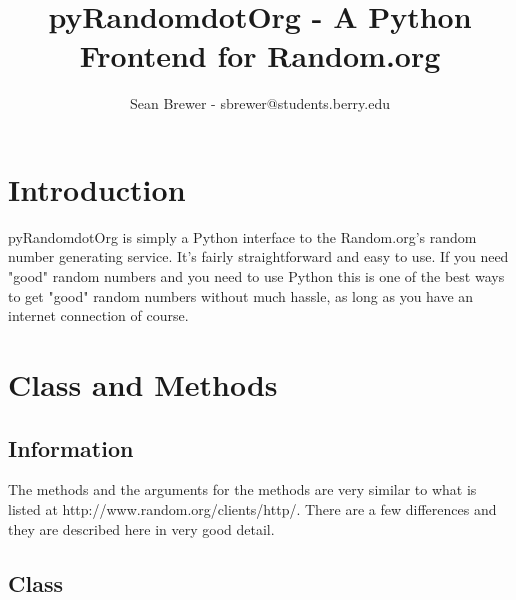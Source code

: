 \documentclass[12 pt]{report}
\begin{document}
\title{\vspace{-0.75in} pyRandomdotOrg - A Python Frontend for Random.org} 
\author{Sean Brewer - sbrewer@students.berry.edu}
\maketitle

\tableofcontents
\pagebreak
 
 
\chapter {Introduction}

pyRandomdotOrg is simply a Python interface to the Random.org's random
number generating service. It's fairly straightforward and easy to use. If you
need "good" random numbers and you need to use Python this is one of the 
best ways to get "good" random numbers without much hassle, as long as you
have an internet connection of course.

\chapter{Class and Methods}

\section{Information}

The methods and the arguments for the methods are very similar to what
is listed at http://www.random.org/clients/http/. There are a few differences
and they are described here in very good detail.

\section{Class}
\end{document}
